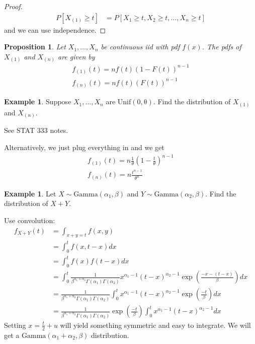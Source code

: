 \documentclass[11pt]{amsart}
\newtheorem{proposition}[theorem]{Proposition}
\theoremstyle{definition}
\newtheorem{example}[theorem]{Example}
\numberwithin{equation}{section}
\begin{document}
\begin{proof}
    \begin{align*}
        P[X_{(1)}\ge t]&=P[X_1\ge t,X_2\ge t,\ldots,X_n\ge t]
    \end{align*}
    and we can use independence.
\end{proof}
\begin{proposition}
    Let $X_1,\ldots,X_n$ be continuous iid with pdf $f(x)$. The pdfs of $X_{(1)}$ and $X_{(n)}$ are given by
    \begin{align*}
        f_{(1)}(t)=nf(t)(1-F(t))^{n-1}\\
        f_{(n)}(t)=nf(t)(F(t))^{n-1}
    \end{align*}
\end{proposition}
\begin{example}
    Suppose $X_1,\ldots,X_n$ are $\mathrm{Unif(0,\theta)}$. Find the distribution of $X_{(1)}$ and $X_{(n)}$.

    See STAT 333 notes.

    Alternatively, we just plug everything in and we get 
    \begin{align*}
        f_{(1)}(t)=n\frac{1}{\theta}(1-\frac{t}{\theta})^{n-1}\\
        f_{(n)}(t)=n\frac{t^{n-1}}{\theta^{n}}
    \end{align*}
\end{example}
\begin{example}
    Let $X\sim\mathrm{Gamma}(\alpha_1,\beta)$ and $Y\sim\mathrm{Gamma}(\alpha_2,\beta)$. Find the distribution of $X+Y$.

    Use convolution:
    \begin{align*}
        f_{X+Y}(t)&=\int_{x+y=t}f(x,y)\\
        &=\int_{0}^tf(x,t-x)dx\\
        &=\int_0^tf(x)f(t-x)dx\\
        &=\int_0^t\frac{1}{\beta^{\alpha_1+\alpha_2}\Gamma(\alpha_1)\Gamma(\alpha_2)}x^{\alpha_1-1}(t-x)^{\alpha_2-1}\exp(\frac{-x-(t-x)}{\beta})dx\\
        &=\frac{1}{\beta^{\alpha_1+\alpha_2}\Gamma(\alpha_1)\Gamma(\alpha_2)}\int_0^tx^{\alpha_1-1}(t-x)^{\alpha_2-1}\exp(\frac{-t}{\beta})dx\\
        &=\frac{1}{\beta^{\alpha_1+\alpha_2}\Gamma(\alpha_1)\Gamma(\alpha_2)}\exp(\frac{-t}{\beta})\int_0^tx^{\alpha_1-1}(t-x)^{\alpha_2-1}dx
    \end{align*}
    Setting $x=\frac{t}{2}+u$ will yield something symmetric and easy to integrate. We will get a $\mathrm{Gamma}(\alpha_1+\alpha_2,\beta)$ distribution.
\end{example}
\newpage
\end{document}
